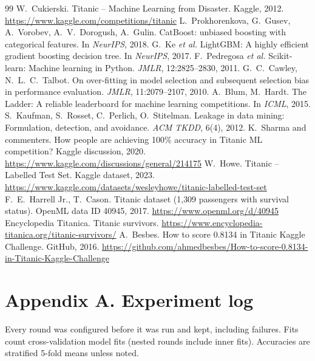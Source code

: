 \documentclass[10pt,twocolumn,letterpaper]{article}
\begin{document}
{\small
\begin{thebibliography}{99}\setlength{\itemsep}{1pt}
 W.~Cukierski. Titanic -- Machine Learning from Disaster. Kaggle, 2012. \url{https://www.kaggle.com/competitions/titanic}
 L.~Prokhorenkova, G.~Gusev, A.~Vorobev, A.~V.~Dorogush, A.~Gulin. CatBoost: unbiased boosting with categorical features. In \emph{NeurIPS}, 2018.
 G.~Ke \emph{et al.} LightGBM: A highly efficient gradient boosting decision tree. In \emph{NeurIPS}, 2017.
 F.~Pedregosa \emph{et al.} Scikit-learn: Machine learning in Python. \emph{JMLR}, 12:2825--2830, 2011.
 G.~C.~Cawley, N.~L.~C.~Talbot. On over-fitting in model selection and subsequent selection bias in performance evaluation. \emph{JMLR}, 11:2079--2107, 2010.
 A.~Blum, M.~Hardt. The Ladder: A reliable leaderboard for machine learning competitions. In \emph{ICML}, 2015.
 S.~Kaufman, S.~Rosset, C.~Perlich, O.~Stitelman. Leakage in data mining: Formulation, detection, and avoidance. \emph{ACM TKDD}, 6(4), 2012.
 K.~Sharma and commenters. How people are achieving 100\% accuracy in Titanic ML competition? Kaggle discussion, 2020. \url{https://www.kaggle.com/discussions/general/214175}
 W.~Howe. Titanic -- Labelled Test Set. Kaggle dataset, 2023. \url{https://www.kaggle.com/datasets/wesleyhowe/titanic-labelled-test-set}
 F.~E.~Harrell Jr., T.~Cason. Titanic dataset (1{,}309 passengers with survival status). OpenML data ID 40945, 2017. \url{https://www.openml.org/d/40945}
 Encyclopedia Titanica. Titanic survivors. \url{https://www.encyclopedia-titanica.org/titanic-survivors/}
 A.~Besbes. How to score 0.8134 in Titanic Kaggle Challenge. GitHub, 2016. \url{https://github.com/ahmedbesbes/How-to-score-0.8134-in-Titanic-Kaggle-Challenge}
\end{thebibliography}
}


\appendix
\section*{Appendix A. Experiment log}
Every round was configured before it was run and kept, including failures. Fits count cross-validation model fits (nested rounds include inner fits). Accuracies are stratified 5-fold means unless noted.
\end{document}
